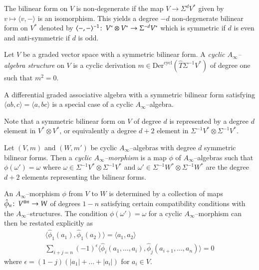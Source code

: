 \documentclass[british]{amsart}
\theoremstyle{plain}
\theoremstyle{definition}
{
\newaliascnt{{definition}}{theorem}\newtheorem{{definition}}[{definition}]{{Definition}}\aliascntresetthe{{definition}}\expandafterautorefname\endcsname{{Definition}}}
{
\newaliascnt{{remark}}{theorem}\newtheorem{{remark}}[{remark}]{{Remark}}\aliascntresetthe{{remark}}\expandafterautorefname\endcsname{{Remark}}}
{
\newaliascnt{{example}}{theorem}\newtheorem{{example}}[{example}]{{Example}}\aliascntresetthe{{example}}\expandafterautorefname\endcsname{{Example}}}
{
\newaliascnt{{examples}}{theorem}\newtheorem{{examples}}[{examples}]{{Examples}}\aliascntresetthe{{examples}}\expandafterautorefname\endcsname{{Examples}}}
{
\newaliascnt{{notation}}{theorem}\newtheorem{{notation}}[{notation}]{{Notation}}\aliascntresetthe{{notation}}\expandafterautorefname\endcsname{{Notation}}}
{
\newaliascnt{{convention}}{theorem}\newtheorem{{convention}}[{convention}]{{Convention}}\aliascntresetthe{{convention}}\expandafterautorefname\endcsname{{Convention}}}
\numberwithin{equation}{section}
\numberwithin{figure}{section}
\begin{document}
The bilinear form on $V$ is non-degenerate if the map $V\rightarrow \Sigma^d V^*$ given by $v\mapsto \langle v, - \rangle$ is an isomorphism. This yields a degree $-d$ non-degenerate bilinear form on $V^*$ denoted by $\langle -, - \rangle^{-1}{\colon\thinspace} V^*\otimes V^* \rightarrow \Sigma^{-d}V^*$ which is symmetric if $d$ is even and anti-symmetric if $d$ is odd.

\begin{definition}
Let $V$ be a graded vector space with a symmetric bilinear form. A \emph{cyclic $A_\infty$--algebra structure} on $V$ is a cyclic derivation $m\in{\mathrm{Der}}^{\mathrm{cycl}}(\widehat{T}\Sigma^{-1}V^*)$ of degree one such that $m^2=0$.
\end{definition}

\begin{remark}
A differential graded associative algebra with a symmetric bilinear form satisfying $\langle ab, c \rangle = \langle a, bc \rangle $ is a special case of a cyclic $A_\infty$--algebra.
\end{remark}

Note that a symmetric bilinear form on $V$ of degree $d$ is represented by a degree $d$ element in $V^*\otimes V^*$, or equivalently a degree $d+2$ element in $\Sigma^{-1}V^*\otimes \Sigma^{-1}V^*$.

\begin{definition}
Let $(V,m)$ and $(W,m')$ be cyclic $A_\infty$--algebras with degree $d$ symmetric bilinear forms. Then a \emph{cyclic $A_\infty$--morphism} is a map $\phi$ of $A_\infty$--algebras such that $\phi(\omega') = \omega$ where $\omega\in\Sigma^{-1}V^*\otimes\Sigma^{-1}V^*$ and $\omega'\in\Sigma^{-1}W^*\otimes \Sigma^{-1}W^*$ are the degree $d+2$ elements representing the bilinear forms.
\end{definition}

\begin{remark}\label{rem:preservebilinear}
An $A_\infty$--morphism $\phi$ from $V$ to $W$ is determined by a collection of maps $\hat{\phi}_n{\colon\thinspace} V^{\otimes n} \rightarrow W$ of degrees $1-n$ satisfying certain compatibility conditions with the $A_\infty$--structures. The condition $\phi(\omega')=\omega$ for a cyclic $A_\infty$--morphism can then be restated explicitly as
\begin{gather*}
\langle \hat{\phi}_1(a_1),\hat{\phi}_1(a_2) \rangle = \langle a_1, a_2 \rangle\\
\sum_{i+j=n} (-1)^\epsilon \langle \hat{\phi}_i(a_1,\dots, a_i), \hat{\phi}_j(a_{i+1},\dots, a_{n} ) \rangle = 0
\end{gather*}
where $\epsilon = (1-j)({\lvert {a_1} \rvert}+\dots +{\lvert {a_i} \rvert})$ for $a_i\in V$.
\end{remark} 
\end{document}
